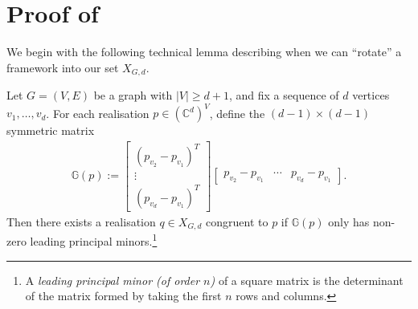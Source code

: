 \documentclass[ALCO]{cedram}
\begin{document}
\section{Proof of \texorpdfstring{}{Lemma}}
\label{sec:xgd}

We begin with the following technical lemma describing when we can ``rotate'' a framework into our set $X_{G,d}$.

\begin{lemma}\label{l:rotate}
	Let $G=(V,E)$ be a graph with $|V| \geq d+1$,
	and fix a sequence of $d$ vertices $v_1,\ldots, v_d$.
	For each realisation $p \in (\mathbb{C}^d)^V$,
	define the $(d-1) \times (d-1)$ symmetric matrix
	\begin{align*}
		\mathbb{G}(p) := 		
		\begin{bmatrix}
			(p_{v_2} - p_{v_1})^T \\
			\vdots \\
			(p_{v_d} - p_{v_1})^T
		\end{bmatrix}
		\begin{bmatrix}
			p_{v_2} - p_{v_1} & \cdots & p_{v_d} - p_{v_1}
		\end{bmatrix}.
	\end{align*}
	Then there exists a realisation $q \in X_{G,d}$ congruent to $p$ if $\mathbb{G}(p)$ only has non-zero leading principal minors.\footnote{A \emph{leading principal minor (of order $n$)} of a square matrix is the determinant of the matrix formed by taking the first $n$ rows and columns.}
\end{lemma}
\end{document}
